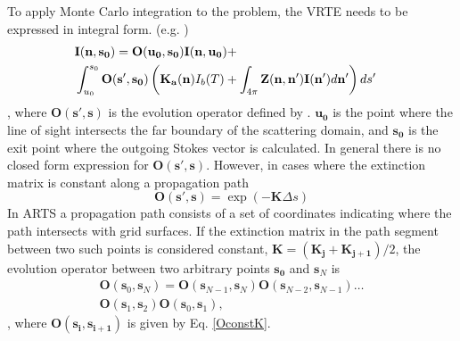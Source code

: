 To apply Monte Carlo integration to the problem, the VRTE needs to be expressed in integral form. (e.g. \cite{hochstadt})
\begin{eqnarray}
\lefteqn{\mathbf{I(n,s_0)}=\mathbf{O(u_0,s_0)I(n,u_0)}+}\nonumber\\
& \int_{u_0}^{s_0}\mathbf{O(s',s_0)}\left(\mathbf{K_a(n)}I_b(T) +\int_{4\pi}\mathbf{Z(n,n')}\mathbf{I(n')}d\mathbf{n'}\right)ds'\nonumber
\end{eqnarray}
\begin{equation}
\label{intVRTE}
\end{equation}
, where $\mathbf{O(s',s)}$ is the evolution operator defined by
\cite{landi85}. $\mathbf{u_0}$ is the point where the line of sight intersects
the far boundary of the scattering domain, and $\mathbf{s_0}$ is the
exit point where the outgoing Stokes vector is calculated.
In general there is no closed form expression for $\mathbf{O(s',s)}$.
However, in cases where the extinction matrix is constant along a
propagation path
\begin{equation}
\mathbf{O(s',s)}=\exp\left(-\mathbf{K}\Delta s\right)
\label{OconstK}
\end{equation}
In ARTS a propagation path consists of a set of coordinates
indicating where the path intersects with grid surfaces.  If the
extinction matrix in the path segment between two such points is
considered constant, $\mathbf{K}=(\mathbf{K_j}+\mathbf{K_{j+1}})/2$,
the evolution operator between two arbitrary points $\mathbf{s_0}$ and
$\mathbf{s}_N$ is
\begin{eqnarray}
\mathbf{O}(\mathbf{s}_0,\mathbf{s}_N) =
\mathbf{O}(\mathbf{s}_{N-1},\mathbf{s}_N)
\mathbf{O}(\mathbf{s}_{N-2},\mathbf{s}_{N-1}) \dots \nonumber\\
\mathbf{O}(\mathbf{s}_1,\mathbf{s}_2)\mathbf{O}(\mathbf{s}_0,\mathbf{s}_1),
\end{eqnarray}
, where $\mathbf{O(s_i,s_{i+1})}$ is given by Eq. \ref{OconstK}.

